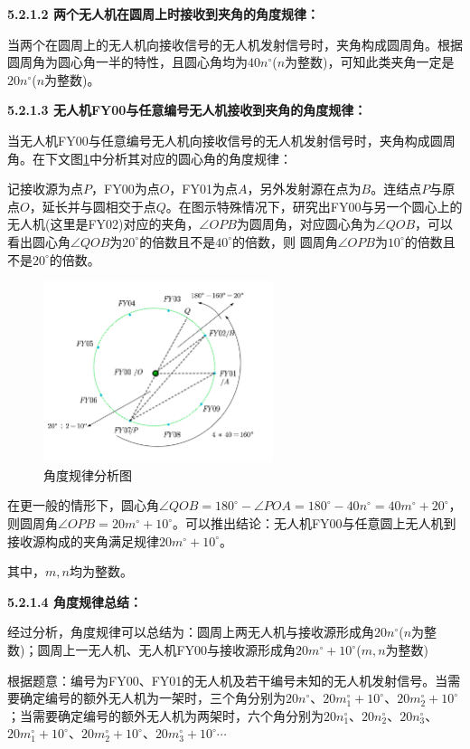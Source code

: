 \documentclass[12pt]{ctexart}
\begin{document}
\begin{spacing}{1.5}
\textbf{5.2.1.2 两个无人机在圆周上时接收到夹角的角度规律：}

当两个在圆周上的无人机向接收信号的无人机发射信号时，夹角构成圆周角。根据圆周角为圆心角一半的特性，且圆心角均为$40n^{\circ}$($n$为整数)，可知此类夹角一定是$20n^{\circ}$($n$为整数)。

\textbf{5.2.1.3 无人机FY00与任意编号无人机接收到夹角的角度规律：}

当无人机FY00与任意编号无人机向接收信号的无人机发射信号时，夹角构成圆周角。在下文图\ref{tu6}中分析其对应的圆心角的角度规律：

记接收源为点$P$，FY00为点$O$，FY01为点$A$，另外发射源在点为$B$。连结点$P$与原点$O$，延长并与圆相交于点$Q$。在图示特殊情况下，研究出FY00与另一个圆心上的无人机(这里是FY02)对应的夹角，$\angle{OPB}$为圆周角，对应圆心角为$\angle{QOB}$，可以看出圆心角$\angle{QOB}$为$20^{\circ}$的倍数且不是$40^{\circ}$的倍数，则
圆周角$\angle{OPB}$为$10^{\circ}$的倍数且不是$20^{\circ}$的倍数。

\begin{figure}[H]
	\centering
	\includegraphics[width=0.6\textwidth]{20n+10.png}
	\caption{角度规律分析图}
	\label{tu6}
\end{figure}

在更一般的情形下，圆心角$\angle{QOB}=180^{\circ}-\angle{POA}=180^{\circ}-40n^{\circ}=40m^{\circ}+20^{\circ}$，则圆周角$\angle{OPB}=20m^{\circ}+10^{\circ}$。可以推出结论：无人机FY00与任意圆上无人机到接收源构成的夹角满足规律$20m^{\circ}+10^{\circ}$。

其中，$m,n$均为整数。

\textbf{5.2.1.4 角度规律总结：}

经过分析，角度规律可以总结为：圆周上两无人机与接收源形成角$20n^{\circ}$($n$为整数)；圆周上一无人机、无人机FY00与接收源形成角$20m^{\circ}+10^{\circ}$($m,n$为整数)

根据题意：编号为FY00、FY01的无人机及若干编号未知的无人机发射信号。当需要确定编号的额外无人机为一架时，三个角分别为$20n^{\circ}$、$20m_1^{\circ}+10^{\circ}$、$20m_2^{\circ}+10^{\circ}$；当需要确定编号的额外无人机为两架时，六个角分别为$20n_1^{\circ}$、$20n_2^{\circ}$、$20n_3^{\circ}$、$20m_1^{\circ}+10^{\circ}$、$20m_2^{\circ}+10^{\circ}$、$20m_3^{\circ}+10^{\circ}\cdots$


\end{spacing}
\end{document}
